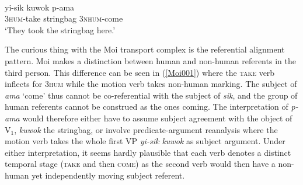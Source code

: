 \ea \label{Moi001}
\\
\gll yi-sik kuwok p-ama \\
\textsc{3}\textsc{hum}-take stringbag \textsc{3}\textsc{nhum}-come \\
\glft `They took the stringbag here.'\\ 
\z

The curious thing with the Moi transport complex is the referential alignment pattern. Moi makes a distinction between human and non-human referents in the third person. This difference can be seen in (\ref{Moi001}) where the \textsc{take} verb inflects for 3\textsc{hum} while the motion verb takes non-human marking. The subject of \textit{ama} `come' thus cannot be co-referential with the subject of \textit{sik}, and the group of human referents cannot be construed as the ones coming. The interpretation of \textit{p-ama} would therefore either have to assume subject agreement with the object of V$_{1}$, \textit{kuwok} the stringbag, or involve predicate-argument reanalysis where the motion verb takes the whole first VP \textit{yi-sik kuwok} as subject argument. Under either interpretation, it seems hardly plausible that each verb denotes a distinct temporal stage (\textsc{take} and then \textsc{come}) as the second verb would then have a non-human yet independently moving subject referent.


